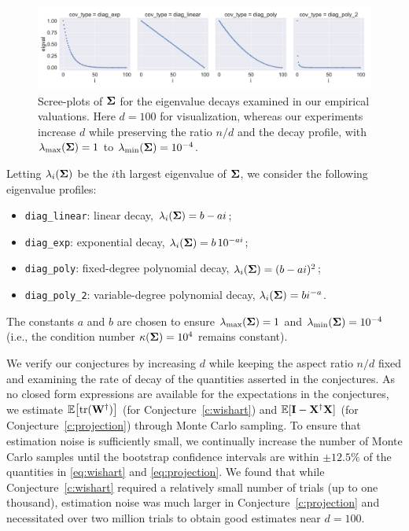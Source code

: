\begin{figure}[t]
  \includegraphics[width=\textwidth]{continuous_figures/decays.pdf}
  \vspace{-1cm}
  \caption{Scree-plots of $\mathbf{\Sigma}$ for the eigenvalue decays examined
    in our empirical valuations. Here $d=100$ for visualization, whereas
    our experiments increase $d$ while preserving the ratio $n/d$ and
    the decay profile,
    with $\lambda_{\text{max}}(\mathbf{\Sigma}) = 1$ to
    $\lambda_{\text{min}}(\mathbf{\Sigma}) = 10^{-4}$.}
  \label{fig:eig-decays}
\end{figure}

Letting $\lambda_i(\mathbf{\Sigma})$ be the $i$th largest eigenvalue of
$\mathbf{\Sigma}$, we consider the
following eigenvalue profiles:
\begin{itemize}
  \item \texttt{diag\_linear}: linear decay, $\lambda_i(\mathbf{\Sigma})= b-a i$;
  \item \texttt{diag\_exp}: exponential decay, $\lambda_i(\mathbf{\Sigma}) = b\,10^{- a i} $;
  \item \texttt{diag\_poly}: fixed-degree polynomial decay, $\lambda_i(\mathbf{\Sigma}) = (b-a i)^2$;
  \item \texttt{diag\_poly\_2}: variable-degree polynomial decay, $\lambda_i(\mathbf{\Sigma}) = b i^{-a}$.
\end{itemize}
The constants $a$ and $b$ are chosen to ensure $\lambda_{\text{max}}(\mathbf{\Sigma}) = 1$ and
$\lambda_{\text{min}}(\mathbf{\Sigma}) = 10^{-4}$ (i.e., the condition number
$\kappa(\mathbf{\Sigma}) = 10^{4}$ remains constant).




We verify our conjectures by increasing $d$ while keeping the aspect ratio
$n/d$ fixed and examining the rate of decay of the quantities asserted
in the conjectures. As no closed form expressions are available for
the expectations in the conjectures, we estimate $\mathbb E\big[\mathrm{tr}(\mathbf W^\dagger)\big]$ (for
Conjecture~\ref{c:wishart}) and $\mathbb E[\mathbf I-\mathbf X^\dagger\mathbf X]$ (for
Conjecture~\ref{c:projection}) through Monte Carlo sampling. To ensure that
estimation noise is sufficiently small, we continually increase the number
of Monte Carlo samples until the bootstrap confidence intervals are
within $\pm 12.5\%$ of the quantities in \eqref{eq:wishart} and
\eqref{eq:projection}. We found that while
Conjecture~\ref{c:wishart} required a relatively small number of
trials (up to one thousand),
estimation noise was much larger in Conjecture~\ref{c:projection} and
necessitated over two million trials to obtain good estimates
near $d=100$.

